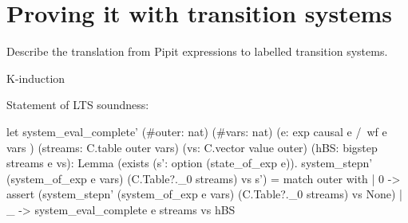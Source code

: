   
  
  \section{Proving it with transition systems}
  
  Describe the translation from Pipit expressions to labelled transition systems.
  
  K-induction
  
  Statement of LTS soundness:
  \begin{code}
  let system_eval_complete'
      (#outer: nat) (#vars: nat)
      (e: exp { causal e /\ wf e vars })
      (streams: C.table outer vars)
      (vs: C.vector value outer)
      (hBS: bigstep streams e vs):
        Lemma (exists (s': option (state_of_exp e)).
          system_stepn'
            (system_of_exp e vars)
            (C.Table?._0 streams) vs s') =
      match outer with
      | 0 -> assert
        (system_stepn'
          (system_of_exp e vars)
          (C.Table?._0 streams) vs None)
      | _ -> system_eval_complete e streams vs hBS
  \end{code}
  